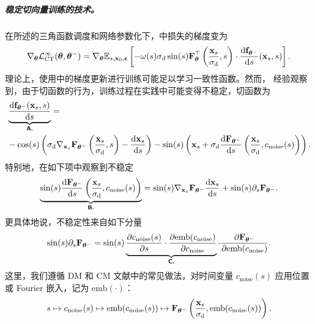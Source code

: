 \subparagraph{稳定切向量训练的技术。}
在所述的三角函数调度和网络参数化下，中损失的梯度变为
\begin{align}\label{eq:conti-ct-loss-trig}
    \nabla_{\bm{\theta}}\mathcal{L}^\infty_{\text{CT}}(\bm{\theta},\bm{\theta}^-)  =\nabla_{\bm{\theta}} \mathbb{E}_{s, {\mathbf{x}}_0, \bm{\epsilon}} \left[ -\omega(s) \sigma_{\mathrm{d}} \sin(s) {\mathbf{F}}_{\bm{\theta}}^\top\left( \frac{{\mathbf{x}}_s}{\sigma_{\mathrm{d}}}, s \right) \cdot \frac{\mathop{}\!\mathrm{d} {\mathbf{f}}_{\bm{\theta}^-}}{\mathop{}\!\mathrm{d} s} ({\mathbf{x}}_s, s) \right].
\end{align}
 理论上，使用中的梯度更新进行训练可能足以学习一致性函数。然而，\citet{lu2024simplifying} 经验观察到，由于切函数的行为，训练过程在实践中可能变得不稳定，切函数为
\begin{align*}
&\underbrace{\frac{\mathop{}\!\mathrm{d} {\mathbf{f}}_{\bm{\theta}^-}({\mathbf{x}}_s, s)}{\mathop{}\!\mathrm{d} s}}_{\text{{\sffamily\textbf{A.}}}}
= \\&-\cos(s) \left( \sigma_{\mathrm{d}} \nabla_{{\mathbf{x}}_s} {\mathbf{F}}_{\bm{\theta}^-}\left( \frac{{\mathbf{x}}_s}{\sigma_{\mathrm{d}}}, s \right) - \frac{\mathop{}\!\mathrm{d} {\mathbf{x}}_s}{\mathop{}\!\mathrm{d} s} \right) - \sin(s) \left( {\mathbf{x}}_s + \sigma_{\mathrm{d}} \frac{\mathop{}\!\mathrm{d} {\mathbf{F}}_{\bm{\theta}^-}}{\mathop{}\!\mathrm{d} s}\left( \frac{{\mathbf{x}}_s}{\sigma_{\mathrm{d}}}, c_{\mathrm{noise}}(s) \right) \right).
\end{align*}
特别地，在如下项中观察到不稳定
\begin{align*}
\underbrace{\sin(s) \frac{\mathop{}\!\mathrm{d} {\mathbf{F}}_{\bm{\theta}^-}}{\mathop{}\!\mathrm{d} s}\left( \frac{{\mathbf{x}}_s}{\sigma_{\mathrm{d}}}, c_{\mathrm{noise}}(s) \right)}_{\text{{\sffamily\textbf{B.}}}}
= \sin(s) \nabla_{{\mathbf{x}}_s} {\mathbf{F}}_{\bm{\theta}^-} \frac{\mathop{}\!\mathrm{d} {\mathbf{x}}_s}{\mathop{}\!\mathrm{d} s}
+ \sin(s) \partial_s {\mathbf{F}}_{\bm{\theta}^-}.
\end{align*}
更具体地说，不稳定性来自如下分量
\begin{align}\label{eq:ds-decomposition}
        \sin(s) \partial_s {\mathbf{F}}_{\bm{\theta}^-} = \sin(s) \underbrace{\frac{\partial c_{\mathrm{noise}}(s)}{\partial s} \cdot \frac{\partial \text{emb}(c_{\mathrm{noise}})}{\partial c_{\mathrm{noise}}}}_{\text{{\sffamily\textbf{C.}}}} \cdot \frac{\partial {\mathbf{F}}_{\bm{\theta}^-}}{\partial \text{emb}(c_{\mathrm{noise}})}.
\end{align}
这里，我们遵循 DM 和 CM 文献中的常见做法，对时间变量 $c_{\mathrm{noise}}(s)$ 应用位置或 Fourier 嵌入，记为 $\text{emb}(\cdot)$：
\[
s \mapsto c_{\mathrm{noise}}(s) \mapsto \text{emb}(c_{\mathrm{noise}}(s)) \mapsto {\mathbf{F}}_{\bm{\theta}^-}\left( \frac{{\mathbf{x}}_s}{\sigma_{\mathrm{d}}}, \text{emb}(c_{\mathrm{noise}}(s)) \right).
\]


